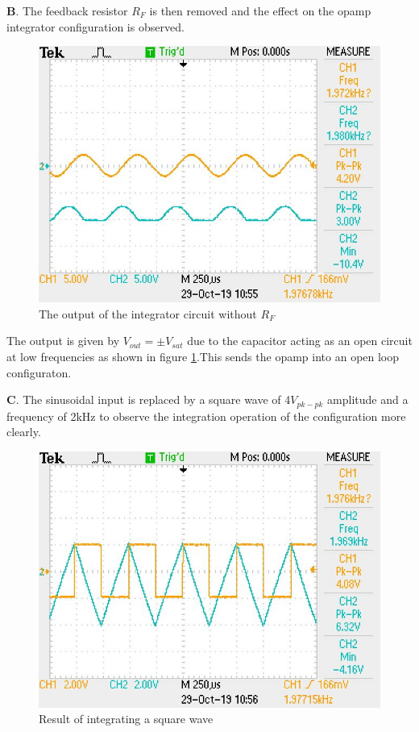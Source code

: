 \documentclass[12pt, titlepage]{article}
\theoremstyle{definition}
\begin{document}
    \textbf{B}. The feedback resistor $R_F$ is then removed and the effect on the opamp integrator configuration is observed.

    \begin{figure}
      \includegraphics[scale=0.25]{images/results_q2.jpeg}
      \caption{The output of the integrator circuit without $R_F$}
      \label{fig:results_q2}
    \end{figure}

    The output is given by $V_{out}=\pm V_{sat}$ due to the capacitor acting as an open circuit at low frequencies as shown in figure \ref{fig:results_q2}.This sends the opamp into an open loop configuraton.

    \textbf{C}. The sinusoidal input is replaced by a square wave of 4$V_{pk-pk}$ amplitude and a frequency of 2kHz to observe the integration operation of the configuration more clearly.

    \begin{figure}
      \includegraphics[scale=0.25]{images/results_q3.jpeg}
      \caption{Result of integrating a square wave}
      \label{fig:results_q3}
    \end{figure}
\end{document}
